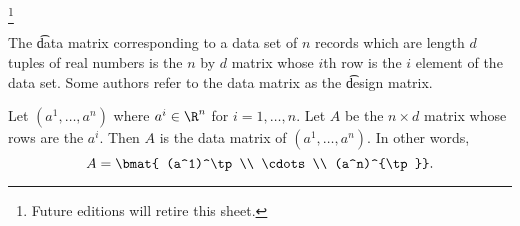 
  \ifhmode\unskip\fi\footnote{
Future editions will retire this sheet.
  }


The \t{data matrix} corresponding to a data set of $n$ records which are length $d$ tuples of real numbers is the $n$ by $d$ matrix whose $i$th row is the $i$ element of the data set.
Some authors refer to the data matrix as the \t{design matrix}.


Let $(a^1, \dots, a^n)$ where $a^i \in \R^n$ for $i = 1, \dots, n$.
Let $A$ be the $n \times d$ matrix whose rows are the $a^i$. Then $A$ is the data matrix of $(a^1, \dots, a^n)$.
In other words,
  \[
A = \bmat{ (a^1)^\tp \\ \cdots \\ (a^n)^{\tp}}.
  \]

\blankpage
